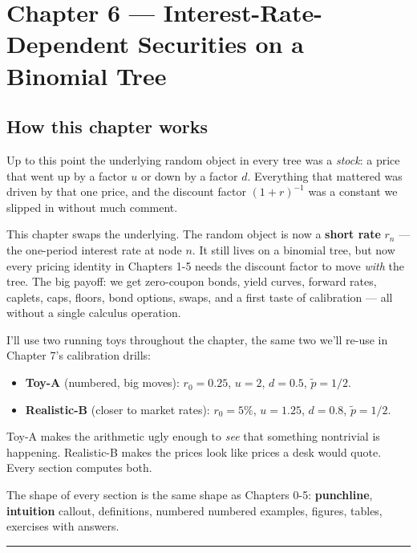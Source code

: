 \documentclass[
  10pt,
  twoside]{book}
\providecommand{\tightlist}{%
  \setlength{\itemsep}{0pt}\setlength{\parskip}{0pt}}
\begin{document}
\newpage

\chapter{Chapter 6 --- Interest-Rate-Dependent Securities on a Binomial
Tree}\label{chapter-6-interest-rate-dependent-securities-on-a-binomial-tree}

\section{How this chapter works}\label{how-this-chapter-works}

Up to this point the underlying random object in every tree was a
\emph{stock}: a price that went up by a factor \(u\) or down by a factor
\(d\). Everything that mattered was driven by that one price, and the
discount factor \((1+r)^{-1}\) was a constant we slipped in without much
comment.

This chapter swaps the underlying. The random object is now a
\textbf{short rate} \(r_n\) --- the one-period interest rate at node
\(n\). It still lives on a binomial tree, but now every pricing identity
in Chapters 1-5 needs the discount factor to move \emph{with} the tree.
The big payoff: we get zero-coupon bonds, yield curves, forward rates,
caplets, caps, floors, bond options, swaps, and a first taste of
calibration --- all without a single calculus operation.

I'll use two running toys throughout the chapter, the same two we'll
re-use in Chapter 7's calibration drills:

\begin{itemize}
\tightlist
\item
  \textbf{Toy-A} (numbered, big moves): \(r_0 = 0.25\), \(u = 2\),
  \(d = 0.5\), \(\tilde p = 1/2\).
\item
  \textbf{Realistic-B} (closer to market rates): \(r_0 = 5\%\),
  \(u = 1.25\), \(d = 0.8\), \(\tilde p = 1/2\).
\end{itemize}

Toy-A makes the arithmetic ugly enough to \emph{see} that something
nontrivial is happening. Realistic-B makes the prices look like prices a
desk would quote. Every section computes both.

The shape of every section is the same shape as Chapters 0-5:
\textbf{punchline}, \textbf{intuition} callout, definitions, numbered
numbered examples, figures, tables, exercises with answers.

\begin{center}\rule{0.5\linewidth}{0.5pt}\end{center}
\end{document}

